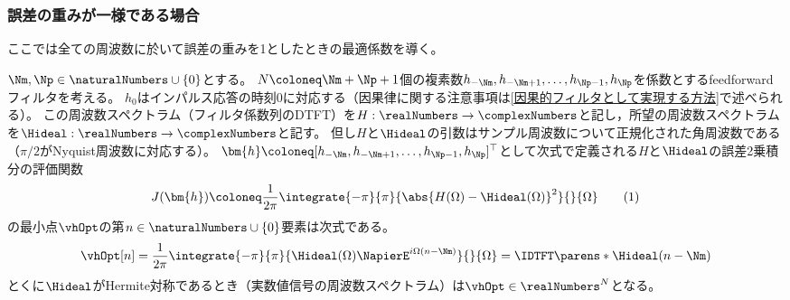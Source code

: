         \subsubsection{誤差の重みが一様である場合}
            \label{誤差の重みが一様である場合}
            ここでは全ての周波数に於いて誤差の重みを1としたときの最適係数を導く。
            \begin{shadebox}
                $\Nm,\Np\in\naturalNumbers\cup\{0\}$とする。
                $N\coloneq\Nm+\Np+1$個の複素数$h_{-\Nm},h_{-\Nm+1},\dots,h_{\Np-1},h_\Np$を係数とするfeedforwardフィルタを考える。
                $h_0$はインパルス応答の時刻0に対応する（因果律に関する注意事項は\ref{因果的フィルタとして実現する方法}で述べられる）。
                この周波数スペクトラム（フィルタ係数列のDTFT）を$H:\realNumbers\to\complexNumbers$と記し，所望の周波数スペクトラムを$\Hideal:\realNumbers\to\complexNumbers$と記す。
                但し$H$と$\Hideal$の引数はサンプル周波数について正規化された角周波数である（$\pi/2$がNyquist周波数に対応する）。
                $\bm{h} \coloneq [h_{-\Nm},h_{-\Nm+1},\dots,h_{\Np-1},h_\Np]^\top$として次式で定義される$H$と$\Hideal$の誤差2乗積分の評価関数
                \[ J(\bm{h}) \coloneq \frac{1}{2\pi}\integrate{-\pi}{\pi}{\abs{H(\Omega)-\Hideal(\Omega)}^2}{}{\Omega} \tag{1} \]
                の最小点$\vhOpt$の第$n\in\naturalNumbers\cup\{0\}$要素は次式である。
                \[ \vhOpt[n] = \frac{1}{2\pi}\integrate{-\pi}{\pi}{\Hideal(\Omega)\NapierE^{i\Omega (n-\Nm)}}{}{\Omega} = \IDTFT\parens*{\Hideal}(n-\Nm) \]
                とくに$\Hideal$がHermite対称であるとき（実数値信号の周波数スペクトラム）は$\vhOpt\in\realNumbers^N$となる。
            \end{shadebox}
